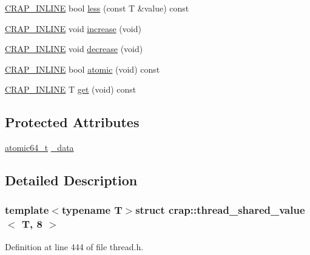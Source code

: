 \begin{DoxyCompactItemize}
\item 
\hyperlink{config__x86_8h_a5a40526b8d842e7ff731509998bb0f1c}{C\+R\+A\+P\+\_\+\+I\+N\+L\+I\+N\+E} bool \hyperlink{structcrap_1_1thread__shared__value_3_01_t_00_018_01_4_abc1d23ab7150f5d0e93dfe8dbccc838a}{less} (const T \&value) const 
\item 
\hyperlink{config__x86_8h_a5a40526b8d842e7ff731509998bb0f1c}{C\+R\+A\+P\+\_\+\+I\+N\+L\+I\+N\+E} void \hyperlink{structcrap_1_1thread__shared__value_3_01_t_00_018_01_4_a178231bb4253c0a08170dd6f4b4635ef}{increase} (void)
\item 
\hyperlink{config__x86_8h_a5a40526b8d842e7ff731509998bb0f1c}{C\+R\+A\+P\+\_\+\+I\+N\+L\+I\+N\+E} void \hyperlink{structcrap_1_1thread__shared__value_3_01_t_00_018_01_4_ae335db7b68c3bd28a6e388c676c66b18}{decrease} (void)
\item 
\hyperlink{config__x86_8h_a5a40526b8d842e7ff731509998bb0f1c}{C\+R\+A\+P\+\_\+\+I\+N\+L\+I\+N\+E} bool \hyperlink{structcrap_1_1thread__shared__value_3_01_t_00_018_01_4_aaf73043e4ddb80e2881d977dbebfcbeb}{atomic} (void) const 
\item 
\hyperlink{config__x86_8h_a5a40526b8d842e7ff731509998bb0f1c}{C\+R\+A\+P\+\_\+\+I\+N\+L\+I\+N\+E} T \hyperlink{structcrap_1_1thread__shared__value_3_01_t_00_018_01_4_a93ca36627e17aead6ec1fdcd8350ec39}{get} (void) const 
\end{DoxyCompactItemize}
\subsection*{Protected Attributes}
\begin{DoxyCompactItemize}
\item 
\hyperlink{structcrap_1_1atomic64__t}{atomic64\+\_\+t} \hyperlink{structcrap_1_1thread__shared__value_3_01_t_00_018_01_4_adee7965118dfc5fd56e862ed29306197}{\+\_\+data}
\end{DoxyCompactItemize}


\subsection{Detailed Description}
\subsubsection*{template$<$typename T$>$struct crap\+::thread\+\_\+shared\+\_\+value$<$ T, 8 $>$}



Definition at line 444 of file thread.\+h.



